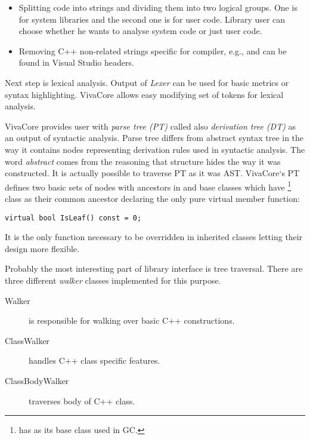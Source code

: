 \begin{itemize}
\item Splitting code into strings and dividing them into two logical groups. One is for system libraries and the second one is for user code. Library user can choose whether he wants to analyse system code or just user code.
\item Removing C++ non-related strings specific for compiler, e.g.,  and  can be found in Visual Studio headers.
\end{itemize}

Next step is lexical analysis. Output of \emph{Lexer} can be used for basic metrics or syntax highlighting. VivaCore allows easy modifying set of tokens for lexical analysis.

VivaCore provides user with \emph{parse tree (PT)} called also \emph{derivation tree (DT)} as an output of syntactic analysis. Parse tree differs from abstract syntax tree in the way it contains nodes representing derivation rules used in syntactic analysis. The word \emph{abstract} comes from the reasoning that structure hides the way it was constructed. It is actually possible to traverse PT as it was AST. VivaCore`s PT defines two basic sets of nodes with ancestors in  and  base classes which have \footnote{ has  as its base class used in GC.} class as their common ancestor declaring the only pure virtual member function:

\begin{lstlisting}[caption={Pure virtual member function of base for VivaCore parse tree node.}]
virtual bool IsLeaf() const = 0;
\end{lstlisting}

It is the only function necessary to be overridden in inherited classes letting their design more flexible.

Probably the most interesting part of library interface is tree traversal. There are three different \emph{walker} classes implemented for this purpose.

\begin{description}
\item[Walker] is responsible for walking over basic C++ constructions.
\item[ClassWalker] handles C++ class specific features.
\item[ClassBodyWalker] traverses body of C++ class.
\end{description}

